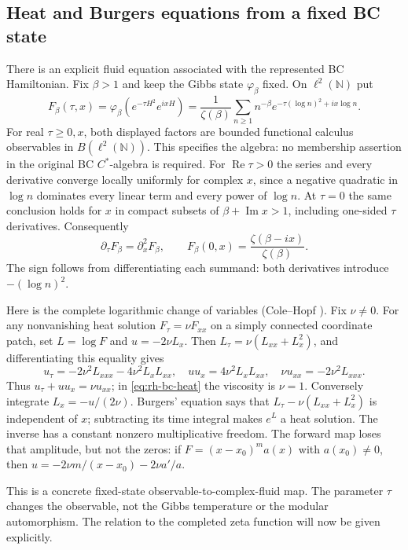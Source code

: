 \subsection{Heat and Burgers equations from a fixed BC state}
\label{sec:rh-bc-heat}

There is an explicit fluid equation associated with the represented
BC Hamiltonian. Fix $\beta>1$ and keep the Gibbs state $\varphi_\beta$
fixed. On $\ell^2(\mathbb N)$ put
\begin{equation}
 F_\beta(\tau,x)=
 \varphi_\beta\!\left(e^{-\tau H^2}e^{ixH}\right)
 =\frac1{\zeta(\beta)}
   \sum_{n\ge1}n^{-\beta}e^{-\tau(\log n)^2+ix\log n}.
 \label{eq:rh-bc-heat}
\end{equation}
For real $\tau\ge0,x$, both displayed factors are bounded functional
calculus observables in $B(\ell^2(\mathbb N))$. This specifies the algebra:
no membership assertion in the original BC $C^*$-algebra is required.
For $\operatorname{Re}\tau>0$ the series and every derivative converge
locally uniformly for complex $x$, since a negative quadratic in $\log n$
dominates every linear term and every power of $\log n$. At $\tau=0$
the same conclusion holds for $x$ in compact subsets of
$\beta+\operatorname{Im}x>1$, including one-sided $\tau$ derivatives.
Consequently
\begin{equation}
 \partial_\tau F_\beta=\partial_x^2F_\beta,\qquad
 F_\beta(0,x)=\frac{\zeta(\beta-ix)}{\zeta(\beta)}.
 \label{eq:rh-bc-heat-initial}
\end{equation}
The sign follows from differentiating each summand:
both derivatives introduce $-(\log n)^2$.

Here is the complete logarithmic change of variables
(Cole--Hopf \cite{hopf1950,cole1951}). Fix $\nu\ne0$. For any nonvanishing heat solution
$F_\tau=\nu F_{xx}$ on a simply connected coordinate patch, set
$L=\log F$ and $u=-2\nu L_x$. Then
$L_\tau=\nu(L_{xx}+L_x^2)$, and differentiating this equality gives
\[
 u_\tau=-2\nu^2L_{xxx}-4\nu^2L_xL_{xx},\quad
 uu_x=4\nu^2L_xL_{xx},\quad
 \nu u_{xx}=-2\nu^2L_{xxx}.
\]
Thus $u_\tau+uu_x=\nu u_{xx}$; in
\eqref{eq:rh-bc-heat} the viscosity is $\nu=1$.
Conversely integrate $L_x=-u/(2\nu)$. Burgers' equation says that
$L_\tau-\nu(L_{xx}+L_x^2)$ is independent of $x$; subtracting its
time integral makes $e^L$ a heat solution. The inverse has a constant
nonzero multiplicative freedom. The forward map loses that amplitude,
but not the zeros: if $F=(x-x_0)^m a(x)$ with $a(x_0)\ne0$, then
$u=-2\nu m/(x-x_0)-2\nu a'/a$.

This is a concrete fixed-state observable-to-complex-fluid map.
The parameter $\tau$ changes the observable, not the Gibbs temperature
or the modular automorphism. The relation to the completed zeta function
will now be given explicitly.

